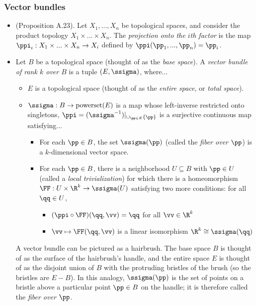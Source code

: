 \subsubsection{Vector bundles}

\begin{itemize}
    \item (Proposition A.23). Let $X_1, ..., X_n$ be topological spaces, and consider the product topology $X_1 \times ... \times X_n$. The \textit{projection onto the $i$th factor} is the map $\ppi_i:X_1 \times ... \times X_n \rightarrow X_i$ defined by $\ppi(\pp_1, ..., \pp_n) = \pp_i$.
    \item Let $B$ be a topological space (thought of as the \textit{base space}). A \textit{vector bundle of rank $k$ over $B$} is a tuple $(E, \ssigma)$, where...
    
    \begin{itemize}
        \item $E$ is a topological space (thought of as the \textit{entire space}, or \textit{total space}).
        \item $\ssigma:B \rightarrow \text{powerset}(E)$ is a map whose left-inverse restricted onto singletons, $\ppi = (\ssigma^{-1})|_{\cup_{\pp \in E} \{\pp\}}$ is a surjective continuous map satisfying...
        \begin{itemize}
            \item For each $\pp \in B$, the set $\ssigma(\pp)$ (called the \textit{fiber over $\pp$}) is a $k$-dimensional vector space.
            \item For each $\pp \in B$, there is a neighborhood $U \subseteq B$ with $\pp \in U$ (called a \textit{local trivialization}) for which there is a homeomorphism $\FF:U \times \R^k \rightarrow \ssigma(U)$ satisfying two more conditions: for all $\qq \in U$,
            \begin{itemize}
                \item $(\ppi \circ \FF)(\qq, \vv) = \qq$ for all $\vv \in \R^k$
                \item $\vv \mapsto \FF(\qq, \vv)$ is a linear isomorphism $\R^k \cong \ssigma(\qq)$
            \end{itemize}
        \end{itemize}
    \end{itemize}
    
    A vector bundle can be pictured as a hairbrush. The base space $B$ is thought of as the surface of the hairbrush's handle, and the entire space $E$ is thought of as the disjoint union of $B$ with the protruding bristles of the brush (so the bristles are $E - B$). In this analogy, $\ssigma(\pp)$ is the set of points on a bristle above a particular point $\pp \in B$ on the handle; it is therefore called the \textit{fiber over $\pp$}.
    

\end{itemize}
